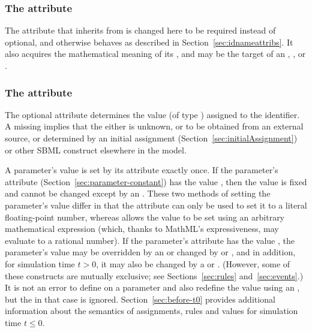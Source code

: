 \begin{blockChanged}
\subsubsection{The  attribute}

The  attribute that \Parameter inherits from \SBase is changed here to be required instead of optional, and otherwise behaves as described in Section~\ref{sec:idnameattribs}.  It also acquires the mathematical meaning of its , and may be the target of an \InitialAssignment, \EventAssignment, or \Rule.
\end{blockChanged}

\subsubsection{The  attribute}
\label{sec:parameter-value}

The optional attribute  determines the value (of type
) assigned to the identifier.  A missing
 implies that the  either is unknown, or
to be obtained from an external source, or determined by an
initial assignment (Section~\ref{sec:initialAssignment}) or 
other SBML construct elsewhere in the model.

A parameter's value is set by its  attribute exactly
once.  If the parameter's  attribute
(Section~\ref{sec:parameter-constant}) has the value ,
then the value is fixed and cannot be changed except by an
\InitialAssignment.  These two methods of setting the parameter's
value differ in that the  attribute can only be used
to set it to a literal floating-point number, whereas
\InitialAssignment allows the value to be set using an arbitrary
mathematical expression (which, thanks to MathML's expressiveness,
may evaluate to a rational number).  If the parameter's
 attribute has the value , the
parameter's value may be overridden by an \InitialAssignment or
changed by \AssignmentRule or \AlgebraicRule, and in addition, for
simulation time $t > 0$, it may also be changed by a \RateRule or
\Event.  (However, some of these constructs are mutually
exclusive; see Sections~\ref{sec:rules} and~\ref{sec:events}.)  It
is not an error to define  on a parameter and also
redefine the value using an \InitialAssignment, but the
 in that case is ignored.
Section~\ref{sec:before-t0} provides additional information about
the semantics of assignments, rules and values for simulation time
$t \leq 0$.


